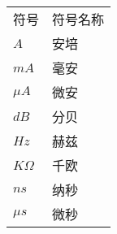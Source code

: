 \begin{center}
    {
    \renewcommand{\arraystretch}{1.28}
    \begin{tabular}{p{4cm}l}
        符号 & 符号名称 \\
        $A$ & 安培 \\
        $mA$ & 毫安 \\
        $\mu A$ & 微安\\
        $dB$ & 分贝 \\
        $Hz$ & 赫兹 \\
        $K\varOmega$ & 千欧 \\
        $ns$ & 纳秒 \\
        $\mu s$ & 微秒 \\
        
    \end{tabular}
    }

\end{center}


